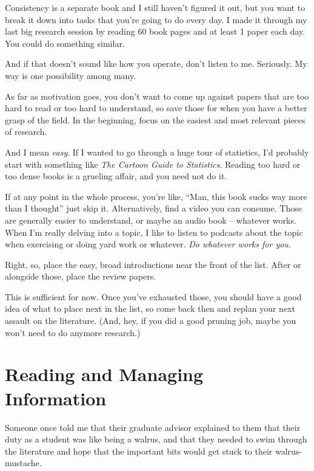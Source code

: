 Consistency is a separate book and I still
haven't figured it out, but you want to break it down into tasks that you're
going to do every day. I made it through my last big research session by
reading 60 book pages and at least 1 paper each day. You could do something
similar.

And if that doesn't sound like how you operate, don't listen to
  me. Seriously. My way is one possibility among many.

As far as motivation goes, you don't want to come up against
papers that are too hard to read or too hard to understand, so save those for
when you have a better grasp of the field. In the beginning, focus on the
easiest and most relevant pieces of research.

And I mean \textit{easy}. If I wanted to go through a huge tour of statistics,
I'd probably start with something like \textit{The Cartoon Guide to
  Statistics}. Reading too hard or too dense books is a grueling affair, and you
need not do it.

If at any point in the whole process, you're like, ``Man, this book sucks way
more than I thought'' just skip it. Alternatively, find a video you can
consume. Those are generally easier to understand, or maybe an audio book -- whatever works. When I'm really delving into a topic, I
like to listen to podcasts about the topic when exercising or doing yard work or
whatever. \textit{Do whatever works for you.}


Right, so, place the easy, broad introductions near the front of the list. After
or alongside those, place the review papers.

This is sufficient for now. Once you've exhausted those, you should
have a good idea of what to place next in the list, so come back then and replan
your next assault on the literature. (And, hey, if you did a good pruning job,
maybe you won't need to do anymore research.)

\section{Reading and Managing Information}

Someone once told me that their graduate advisor explained to them that their
duty as a student was like being a walrus, and that they needed to swim
through the literature and hope that the important bits would get stuck to their
walrus-mustache.

